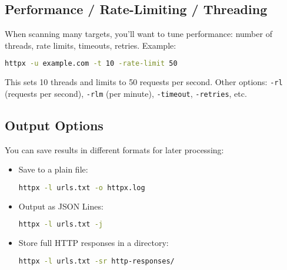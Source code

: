 \documentclass[11pt,a4paper]{article}
\begin{document}
\subsection*{Performance / Rate-Limiting / Threading}
When scanning many targets, you’ll want to tune performance: number of threads, rate limits, timeouts, retries. Example:  
\begin{lstlisting}[language=bash]
httpx -u example.com -t 10 -rate-limit 50
\end{lstlisting}
This sets 10 threads and limits to 50 requests per second.
Other options: \texttt{-rl} (requests per second), \texttt{-rlm} (per minute), \texttt{-timeout}, \texttt{-retries}, etc.

\subsection*{Output Options}
You can save results in different formats for later processing:  
\begin{itemize}
  \item Save to a plain file:  
\begin{lstlisting}[language=bash]
httpx -l urls.txt -o httpx.log
\end{lstlisting}
  \item Output as JSON Lines:  
\begin{lstlisting}[language=bash]
httpx -l urls.txt -j
\end{lstlisting}

  \item Store full HTTP responses in a directory:  
\begin{lstlisting}[language=bash]
httpx -l urls.txt -sr http-responses/
\end{lstlisting}
  
\end{itemize}
\end{document}
